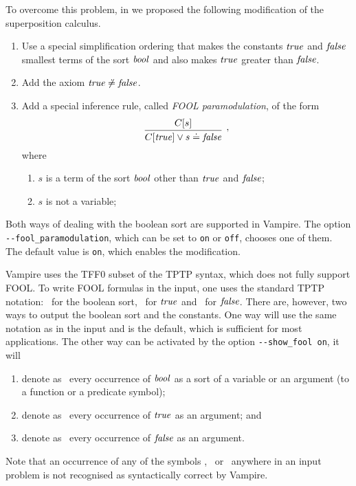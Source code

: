 To overcome this problem, in \cite{FOOL} we proposed the following modification of the superposition calculus.
\begin{enumerate}
  \item Use a special simplification ordering that makes the constants $\mathit{true}$ and $\mathit{false}$ smallest terms of the sort $\mathit{bool}$ and also makes $\mathit{true}$ greater than $\mathit{false}$.

\item Add the axiom $\mathit{true} \not\doteq \mathit{false}$.

\item Add a special inference rule, called \emph{FOOL paramodulation}, of the form
  \[
    \infer[,]{C[\mathtt{\true}] \lor s \eql \mathtt{\false}}{C[s]}
  \]
where
\begin{enumerate}
\item $s$ is a term of the sort $\mathit{bool}$ other than $\mathit{true}$ and $\mathit{false}$;
\item $s$ is not a variable;
\end{enumerate}
\end{enumerate}

Both ways of dealing with the boolean sort are supported in Vampire. The option \verb|--fool_paramodulation|, which can be set to \verb|on| or \verb|off|, chooses one of them. The default value is \verb|on|, which enables the modification.

Vampire uses the TFF0 subset of the TPTP syntax, which does not fully support FOOL. To write FOOL formulas in the input, one uses the standard TPTP notation: \tptpo\ for the boolean sort, \dtrue\ for $\mathit{true}$ and \dfalse\ for $\mathit{false}$. There are, however, two ways to output the boolean sort and the constants. One way will use the same notation as in the input and is the default, which is sufficient for most applications. The other way can be activated by the option \verb'--show_fool on', it will
\begin{enumerate}
  \item denote as \dbool\ every occurrence of $\mathit{bool}$ as a sort of a variable or an argument (to a function or a predicate symbol);
  \item denote as \ddtrue\ every occurrence of $\mathit{true}$ as an argument; and
  \item denote as \ddfalse\ every occurrence of $\mathit{false}$ as an argument.
\end{enumerate}
Note that an occurrence of any of the symbols \dbool, \ddtrue\ or \ddfalse\ anywhere in an input problem is not recognised as syntactically correct by Vampire.

